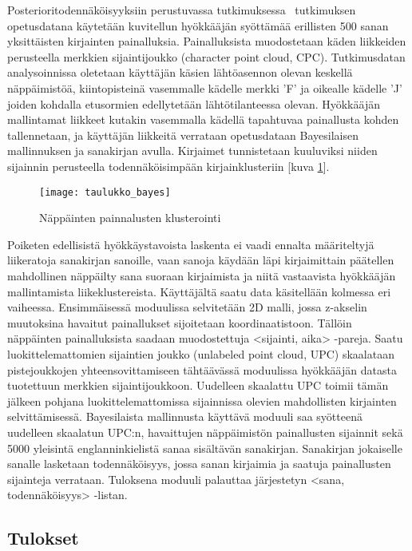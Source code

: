 \documentclass[finnish]{tktltiki2}
\theoremstyle{definition}
\theoremstyle{remark}
\begin{document}
Posterioritodennäköisyyksiin perustuvassa tutkimuksessa~\cite{mole} tutkimuksen opetusdatana käytetään kuvitellun hyökkääjän syöttämää erillisten 500 sanan yksittäisten kirjainten painalluksia. Painalluksista muodostetaan käden liikkeiden perusteella merkkien sijaintijoukko (character point cloud, CPC). Tutkimusdatan analysoinnissa oletetaan käyttäjän käsien lähtöasennon olevan keskellä näppäimistöä, kiintopisteinä vasemmalle kädelle merkki 'F' ja oikealle kädelle 'J' joiden kohdalla etusormien edellytetään lähtötilanteessa olevan. Hyökkääjän mallintamat liikkeet kutakin vasemmalla kädellä tapahtuvaa painallusta kohden tallennetaan, ja käyttäjän liikkeitä verrataan opetusdataan Bayesilaisen mallinnuksen ja sanakirjan avulla. Kirjaimet tunnistetaan kuuluviksi niiden sijainnin perusteella todennäköisimpään kirjainklusteriin [kuva \ref{fig:bayes}].

\begin{figure}[!h]
\centering
\texttt{[image: taulukko\_bayes]}
\caption{Näppäinten painnalusten klusterointi}
\label{fig:bayes}
\end{figure}

Poiketen edellisistä hyökkäystavoista laskenta ei vaadi ennalta määriteltyjä liikeratoja sanakirjan sanoille, vaan sanoja käydään läpi kirjaimittain päätellen mahdollinen näppäilty sana suoraan kirjaimista ja niitä vastaavista hyökkääjän mallintamista liikeklustereista. 
Käyttäjältä saatu data käsitellään kolmessa eri vaiheessa. Ensimmäisessä moduulissa selvitetään 2D malli, jossa z-akselin muutoksina havaitut painallukset sijoitetaan koordinaatistoon. Tällöin näppäinten painalluksista saadaan muodostettuja <sijainti, aika> -pareja. Saatu luokittelemattomien sijaintien joukko (unlabeled point cloud, UPC) skaalataan pistejoukkojen yhteensovittamiseen tähtäävässä moduulissa hyökkääjän datasta tuotettuun merkkien sijaintijoukkoon. Uudelleen skaalattu UPC toimii tämän jälkeen pohjana luokittelemattomissa sijainnissa olevien mahdollisten kirjainten selvittämisessä. 
Bayesilaista mallinnusta käyttävä moduuli saa syötteenä uudelleen skaalatun UPC:n, havaittujen näppäimistön painallusten sijainnit sekä 5000 yleisintä englanninkielistä sanaa sisältävän sanakirjan. Sanakirjan jokaiselle sanalle lasketaan todennäköisyys, jossa sanan kirjaimia ja saatuja painallusten sijainteja verrataan. Tuloksena moduuli palauttaa järjestetyn <sana, todennäköisyys> -listan.

\subsection{Tulokset}
\end{document}
